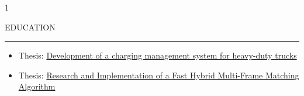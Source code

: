 \documentclass[9pt,a4paper,ragged2e,withhyper]{altacv}
\renewcommand{\cvsectionfont}{\LARGE\fontseries{eb}\selectfont}
\renewcommand{\cvsection}[2][]{%
  \nointerlineskip\medskip%
  \ifstrequal{#1}{}{}{\marginpar{\vspace*{\dimexpr1pt-\baselineskip}\raggedright}}%
  {\color{heading}\cvsectionfont\MakeUppercase{#2}}\\[-1ex]%
  {\color{headingrule}\rule{\linewidth}{2pt}\par}\smallskip
}
\begin{document}
\begin{paracol}{1}

        \cvsection{Education}
            \begin{itemize}
                \item Thesis: \href{https://kth.diva-portal.org/smash/get/diva2:1707576/FULLTEXT01.pdf}{Development of a charging management system for heavy-duty trucks}
            \end{itemize}
            
            \begin{itemize}
                \item Thesis: \href{https://blog.csdn.net/SunXiaoying2016/article/details/145464809?spm=1001.2014.3001.5502}{Research and Implementation of a Fast Hybrid Multi-Frame Matching Algorithm}
            \end{itemize}

    \end{paracol}
\end{document}

